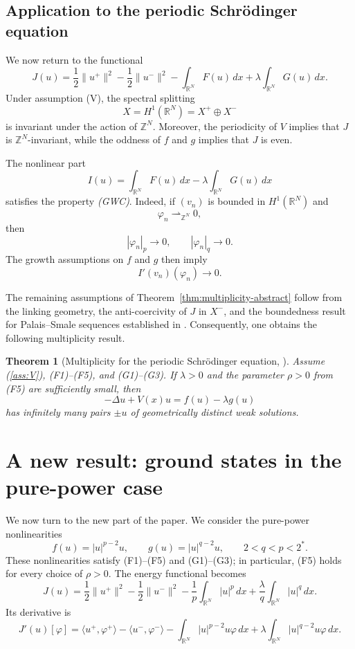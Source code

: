 \documentclass[11pt]{amsart}
\numberwithin{equation}{section}
\newtheorem{theorem}{Theorem}[section]
\theoremstyle{definition}
\newcommand{\R}{\mathbb{R}}
\newcommand{\Z}{\mathbb{Z}}
\begin{document}
\subsection{Application to the periodic Schr\"odinger equation}

We now return to the functional
\[
J(u)
=
\frac12\|u^+\|^2
-
\frac12\|u^-\|^2
-
\int_{\R^N}F(u)\,dx
+
\lambda\int_{\R^N}G(u)\,dx.
\]
Under assumption \textup{(V)}, the spectral splitting
\[
X=H^1(\R^N)=X^+\oplus X^-
\]
is invariant under the action of $\Z^N$. Moreover, the periodicity of $V$
implies that $J$ is $\Z^N$-invariant, while the oddness of $f$ and $g$
implies that $J$ is even.

The nonlinear part
\[
I(u)
=
\int_{\R^N}F(u)\,dx
-
\lambda\int_{\R^N}G(u)\,dx
\]
satisfies the property \emph{(GWC)}. Indeed, if $(v_n)$ is bounded in
$H^1(\R^N)$ and
\[
\varphi_n\rightharpoonup_{\Z^N}0,
\]
then
\[
|\varphi_n|_p\to0,
\qquad
|\varphi_n|_q\to0.
\]
The growth assumptions on $f$ and $g$ then imply
\[
I'(v_n)(\varphi_n)\to0.
\]

The remaining assumptions of Theorem~\ref{thm:multiplicity-abstract} follow from the linking geometry, the
anti-coercivity of $J$ in $X^-$, and the
boundedness result for Palais--Smale sequences established in
\cite{BBS2025}. Consequently, one obtains the following multiplicity
result.

\begin{theorem}[Multiplicity for the periodic Schr\"odinger equation, {\cite[Theorem 4.7]{BBS2025}}]
Assume (\ref{ass:V}), (F1)--(F5), and (G1)--(G3). If
$\lambda>0$ and the parameter $\rho>0$ from (F5) are sufficiently
small, then
\[
-\Delta u+V(x)u=f(u)-\lambda g(u)
\]
has infinitely many pairs $\pm u$ of geometrically distinct weak
solutions.
\end{theorem}



\section{A new result: ground states in the pure-power case}

We now turn to the new part of the paper. We consider the pure-power
nonlinearities
\[
f(u)=|u|^{p-2}u,\qquad
g(u)=|u|^{q-2}u,
\qquad 2<q<p<2^*.
\]
These nonlinearities satisfy (F1)--(F5) and (G1)--(G3); in particular,
(F5) holds for every choice of $\rho>0$. The energy functional becomes
\begin{equation}\label{eq:J-power}
J(u)=\frac12\|u^+\|^2-\frac12\|u^-\|^2
-\frac1p\int_{\R^N}|u|^p\,dx
+\frac{\lambda}{q}\int_{\R^N}|u|^q\,dx.
\end{equation}
Its derivative is
\begin{equation}
J'(u)[\varphi]
=
\langle u^+,\varphi^+\rangle-\langle u^-,\varphi^-\rangle
-\int_{\R^N}|u|^{p-2}u\varphi\,dx
+\lambda\int_{\R^N}|u|^{q-2}u\varphi\,dx.
\end{equation}
\end{document}
